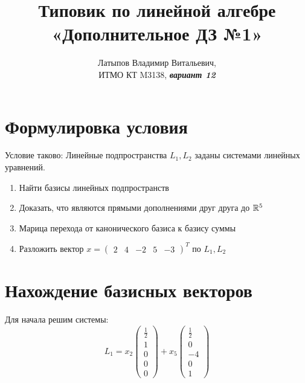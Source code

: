 \documentclass[12pt, a4paper]{article}
\author{Латыпов Владимир Витальевич, \\ ИТМО КТ M3138, \Huge{\textit{\textbf{вариант 12}}}}
\title{Типовик по линейной алгебре «Дополнительное ДЗ №1»}
\begin{document}
    \tit

    \section{Формулировка условия}

    \begin{statement}
        Условие таково: 
        Линейные подпространства $L_1, L_2$ заданы системами линейных уравнений.
        
        \begin{enumerate}
            \item Найти базисы линейных подпространств 
            \item Доказать, что являются прямыми дополнениями друг друга до ${\mathbb{R}}^5$
            \item Марица перехода от канонического базиса к базису суммы
            \item Разложить вектор $x = \begin{pmatrix}
                2 & 4 & -2 & 5 & -3
            \end{pmatrix}^T$ по $L_1, L_2$
        \end{enumerate}
    \end{statement}

    \section{Нахождение базисных векторов}

    Для начала решим системы:
    \begin{equation}
        L_1 = x_2 \left(\begin{matrix}
            \frac{1}{2} \\
            1 \\
            0 \\
            0 \\
            0
        \end{matrix}\right) + x_5 \left(\begin{matrix}
            \frac{1}{2} \\
            0 \\
            -4 \\
            0 \\
            1
        \end{matrix}\right)
    \end{equation}
\end{document}

